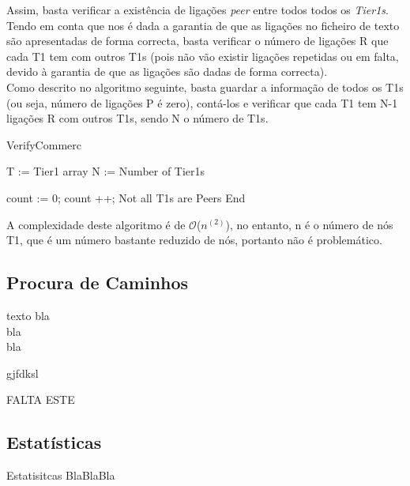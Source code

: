 \documentclass[twocolumn]{article} %
\begin{document}
			\noindent Assim, basta verificar a existência de ligações \emph{peer} entre todos todos os \emph{Tier1s}. Tendo em conta que nos é dada a garantia de que as ligações no ficheiro de texto são apresentadas de forma correcta, basta verificar o número de ligações R que cada T1 tem com  outros T1s (pois não vão existir ligações repetidas ou em falta, devido à garantia de que as ligações são dadas de forma correcta).\\
			\noindent Como descrito no algoritmo seguinte, basta guardar a informação de todos os T1s (ou seja, número de ligações P é zero), contá-los e verificar que cada T1 tem N-1 ligações R com outros T1s, sendo N o número de T1s.\\


			\begin{algorithm}[htbp]
			\caption{VerifyCommerc}
			\begin{algorithmic}[1]
				
				\State T := Tier1 array
				\State N := Number of Tier1s

					\State count := 0;
							\State count ++;
						\EndIf
					\EndFor
						\State Not all T1s are Peers
						\State End
					\EndIf
				\EndFor
			\end{algorithmic}
			\end{algorithm}

			\noindent A complexidade deste algoritmo é de $\mathcal{O}$($n^(2)$), no entanto, n é o número de nós T1, que é um número bastante reduzido de nós, portanto não é problemático.

		\subsection{Procura de Caminhos}
			texto bla\\
			bla\\
			bla\\

			\begin{algorithm}[htbp]
			\caption{gjfdksl}
			\begin{algorithmic}[1]
				
				\State FALTA ESTE

			\end{algorithmic}
			\end{algorithm}


		\subsection{Estatísticas}
			Estatisitcas BlaBlaBla \\
\end{document}
